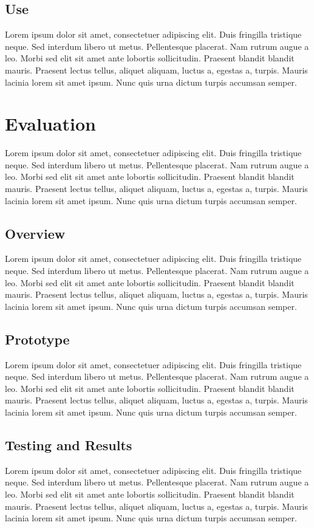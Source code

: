 \documentclass[journal]{IEEEtran}
\begin{document}
\subsection{Use}
Lorem ipsum dolor sit amet, consectetuer adipiscing elit.
Duis fringilla tristique neque. Sed interdum libero ut metus. Pellentesque placerat. Nam rutrum augue a leo.
Morbi sed elit sit amet ante lobortis sollicitudin. Praesent blandit blandit mauris. Praesent lectus tellus,
aliquet aliquam, luctus a, egestas a, turpis. Mauris lacinia lorem sit amet ipsum. Nunc quis urna dictum
turpis accumsan semper.

\section{Evaluation}
Lorem ipsum dolor sit amet, consectetuer adipiscing elit.
Duis fringilla tristique neque. Sed interdum libero ut metus. Pellentesque placerat. Nam rutrum augue a leo.
Morbi sed elit sit amet ante lobortis sollicitudin. Praesent blandit blandit mauris. Praesent lectus tellus,
aliquet aliquam, luctus a, egestas a, turpis. Mauris lacinia lorem sit amet ipsum. Nunc quis urna dictum
turpis accumsan semper.
\subsection{Overview}
Lorem ipsum dolor sit amet, consectetuer adipiscing elit.
Duis fringilla tristique neque. Sed interdum libero ut metus. Pellentesque placerat. Nam rutrum augue a leo.
Morbi sed elit sit amet ante lobortis sollicitudin. Praesent blandit blandit mauris. Praesent lectus tellus,
aliquet aliquam, luctus a, egestas a, turpis. Mauris lacinia lorem sit amet ipsum. Nunc quis urna dictum
turpis accumsan semper.
\subsection{Prototype}
Lorem ipsum dolor sit amet, consectetuer adipiscing elit.
Duis fringilla tristique neque. Sed interdum libero ut metus. Pellentesque placerat. Nam rutrum augue a leo.
Morbi sed elit sit amet ante lobortis sollicitudin. Praesent blandit blandit mauris. Praesent lectus tellus,
aliquet aliquam, luctus a, egestas a, turpis. Mauris lacinia lorem sit amet ipsum. Nunc quis urna dictum
turpis accumsan semper.
\subsection{Testing and Results}
Lorem ipsum dolor sit amet, consectetuer adipiscing elit.
Duis fringilla tristique neque. Sed interdum libero ut metus. Pellentesque placerat. Nam rutrum augue a leo.
Morbi sed elit sit amet ante lobortis sollicitudin. Praesent blandit blandit mauris. Praesent lectus tellus,
aliquet aliquam, luctus a, egestas a, turpis. Mauris lacinia lorem sit amet ipsum. Nunc quis urna dictum
turpis accumsan semper.
\end{document}
